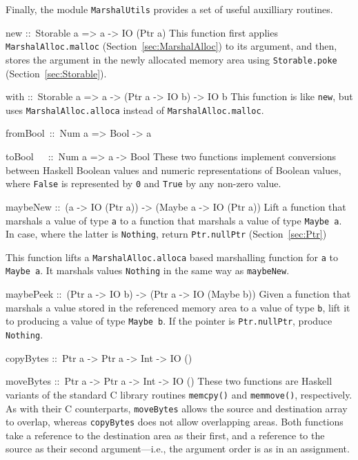 \documentclass[a4paper,twosides]{article}
\makeatletter
\newcommand{\code}[1]{\texttt{#1}}      %
\newenvironment{codedesc}{%
  \list{}{\labelwidth\z@
    \let\makelabel\codedesclabel}
  }{%
  \endlist
  }
\newcommand*{\codedesclabel}[1]{%
  \hspace{-\leftmargin}
  \parbox[b]{\labelwidth}{\makebox[0pt][l]{\code{#1}}\\}\hfil\relax
  }
\newcommand{\combineitems}{\vspace*{-\itemsep}\vspace*{-\parsep}\vspace*{-1em}}
\makeatother
\begin{document}
Finally, the module \code{MarshalUtils} provides a set of useful auxilliary
routines. 
%
\begin{codedesc}
\item[new ::\ Storable a => a -> IO (Ptr a)] This function first applies
  \code{MarshalAlloc.malloc} (Section~\ref{sec:MarshalAlloc}) to its
  argument, and then, stores the argument in the newly allocated memory area
  using \code{Storable.poke} (Section~\ref{sec:Storable}).
  
\item[with ::\ Storable a => a -> (Ptr a -> IO b) -> IO b] This function is
  like \code{new}, but uses \code{MarshalAlloc.alloca} instead of
  \code{MarshalAlloc.malloc}.

\item[fromBool~::\ Num a => Bool -> a]
\item[toBool~~~::\ Num a => a -> Bool]\combineitems These two functions
  implement conversions between Haskell Boolean values and numeric
  representations of Boolean values, where \code{False} is represented by
  \code{0} and \code{True} by any non-zero value.

\item[maybeNew ::\ (a -> IO (Ptr a)) -> (Maybe a -> IO (Ptr a))]
  Lift a function that marshals a value of type \code{a} to a function that
  marshals a value of type \code{Maybe a}.  In case, where the latter is
  \code{Nothing}, return \code{Ptr.nullPtr} (Section~\ref{sec:Ptr})

\item[maybeWith ::\ (a -> (Ptr b -> IO c) -> IO c)%
  -> (Maybe a -> (Ptr b -> IO c) -> IO c)] This function lifts a
  \code{MarshalAlloc.alloca} based marshalling function for \code{a} to
  \code{Maybe a}.  It marshals values \code{Nothing} in the same way as
  \code{maybeNew}. 
  
\item[maybePeek ::\ (Ptr a -> IO b) -> (Ptr a -> IO (Maybe b))] Given a
  function that marshals a value stored in the referenced memory area to a
  value of type \code{b}, lift it to producing a value of type \code{Maybe b}.
  If the pointer is \code{Ptr.nullPtr}, produce \code{Nothing}.
  

\item[copyBytes ::\ Ptr a -> Ptr a -> Int -> IO ()]
\item[moveBytes ::\ Ptr a -> Ptr a -> Int -> IO ()]\combineitems These two
  functions are Haskell variants of the standard C library routines
  \code{memcpy()} and \code{memmove()}, respectively.  As with their C
  counterparts, \code{moveBytes} allows the source and destination array to
  overlap, whereas \code{copyBytes} does not allow overlapping areas.  Both
  functions take a reference to the destination area as their first, and a
  reference to the source as their second argument---i.e., the argument order
  is as in an assignment.
\end{codedesc}
\end{document}
